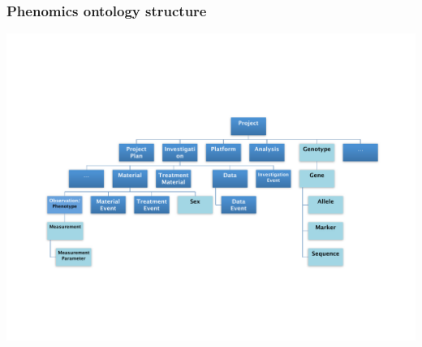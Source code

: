 \documentclass[12pt]{beamer}
\begin{document}
\begin{frame}
\frametitle{Phenomics ontology structure}

\begin{center}
 \includegraphics[scale=0.40,keepaspectratio=true]{./podd_ont.pdf}
\end{center}


\end{frame}
\end{document}
